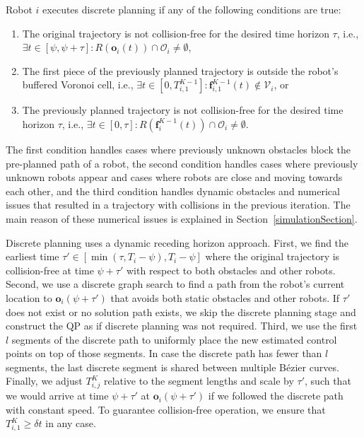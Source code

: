 \documentclass{svproc}
\newcommand{\vf}{\mathbf{f}}
\newcommand{\vo}{\mathbf{o}}
\newcommand{\cV}{\mathcal{V}}
\newcommand{\cO}{\mathcal{O}}
\begin{document}
Robot $i$ executes discrete planning if any of the following conditions are true:
\begin{enumerate}
    \item The original trajectory is not collision-free for the desired time horizon $\tau$, i.e., $\exists t\in [\psi,\psi+\tau] : R(\vo_i(t)) \cap \cO_i \neq \emptyset$,
    \item The first piece of the previously planned trajectory is outside the robot's buffered Voronoi cell, i.e., $\exists t\in [0, T^{K-1}_{i,1}] : \vf^{K-1}_{i,1}(t) \not\in \cV_i$, or
    \item The previously planned trajectory is not collision-free for the desired time horizon $\tau$, i.e., $\exists t\in [0,\tau] :  R(\vf^{K-1}_i(t)) \cap \cO_i \neq \emptyset$.
\end{enumerate}
The first condition handles cases where previously unknown obstacles block the pre-planned path of a robot, the second condition handles cases where previously unknown robots appear and cases where robots are close and moving towards each other, and the third condition handles dynamic obstacles and numerical issues that resulted in a trajectory with collisions in the previous iteration. The main reason of these numerical issues is explained in Section~\ref{simulationSection}.

Discrete planning uses a dynamic receding horizon approach. First, we find the earliest time $\tau'\in [\min(\tau, T_i-\psi), T_i-\psi]$ where the original trajectory is collision-free at time $\psi + \tau'$ with respect to both obstacles and other robots.
Second, we use a discrete graph search to find a path from the robot's current location to $\vo_i(\psi+\tau')$ that avoids both static obstacles and other robots.
If $\tau'$ does not exist or no solution path exists, we skip the discrete planning stage and construct the QP as if discrete planning was not required.
Third, we use the first $l$ segments of the discrete path to uniformly place the new estimated control points on top of those segments.
In case the discrete path has fewer than $l$ segments, the last discrete segment is shared between multiple B\'ezier curves.
Finally, we adjust $T_{i,j}^K$ relative to the segment lengths and scale by $\tau'$, such that we would arrive at time $\psi+\tau'$ at $\vo_i(\psi+\tau')$ if we followed the discrete path with constant speed.
To guarantee collision-free operation, we ensure that $T_{i,1}^K\geq \delta t$ in any case.
\end{document}
